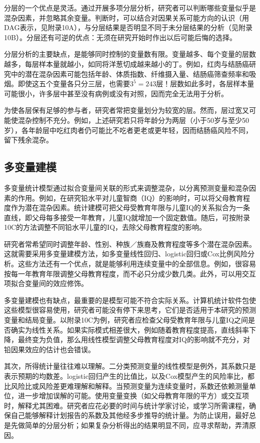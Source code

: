分层的一个优点是灵活。通过开展多项分层分析，研究者可以判断哪些变量似乎是混杂因素，并忽略其余变量。判断时，可以结合对因果关系可能方向的认识（用DAG表示，见附录10A），与分层结果是否明显不同于未分层结果的分析（见附录10B）。分层还有可逆的优点：无须在研究开始时作出以后可能后悔的选择。

分层分析的主要缺点，是能够同时控制的变量数有限。变量越多、每个变量的层数越多，每层样本量就越小，如同将洋葱切成越来越小的丁。例如，红肉与结肠癌研究中的潜在混杂因素可能包括年龄、体质指数、纤维摄入量、结肠癌筛查频率和吸烟。即使这五个变量各只分三层，也需要$3^5=243$层！层数如此多时，各层样本量可能很小，许多层中甚至没有病例或没有对照，因而完全无法用于分析。

为使各层保有足够的参与者，研究者常把变量划分为较宽的层。然而，层过宽又可能使混杂控制不充分。例如，上述研究若只将年龄分为两层（小于50岁与至少50岁），各年龄层中吃红肉者仍可能比不吃者更老或更年轻，因而结肠癌风险不同，留下残余混杂。

\subsection{多变量建模}
多变量统计模型通过拟合变量间关联的形式来调整混杂，以分离预测变量和混杂因素的作用。例如，在研究铅水平对儿童智商（IQ）的影响时，可以将父母教育程度作为潜在混杂因素。统计建模可把父母受教育年限与儿童IQ的关系拟合为一条直线，即父母每多接受一年教育，儿童IQ就增加一个固定数值。随后，可按附录10C的方法调整不同铅水平儿童的IQ，去除父母教育程度的影响。

研究者常希望同时调整年龄、性别、种族／族裔及教育程度等多个潜在混杂因素。这就需要采用多变量建模方法，如多变量线性回归、logistic回归或Cox比例风险分析。这些方法还有一个优点，就是能够利用连续变量中的全部信息。例如，很容易按每一年教育年限调整父母教育程度，而不必只分成少数几类。此外，可以用交互项拟合变量间的效应修饰。

多变量建模也有缺点，最重要的是模型可能不符合实际关系。计算机统计软件包使这些模型很容易使用，研究者可能没有停下来思考，它们是否适用于本研究的预测变量和结局变量。以附录10C为例，研究者应检查父母受教育年限与儿童IQ之间是否确实为线性关系。如果实际模式相差很大，例如随着教育程度提高，直线斜率下降，最终变为负值，那么用线性模型调整父母教育程度对IQ的影响就不充分，对铅因果效应的估计也会错误。

其次，所得统计量往往难以理解。二分类预测变量的线性模型是例外，其系数只是表示预期的均数差。logistic回归产生的比值比，以及Cox模型产生的风险率比，都比风险比或风险差更难理解和解释。当预测变量为连续变量时，系数还依赖测量单位，进一步增加误解的可能。使用变量变换（如父母教育年限的平方）或交互项时，解释尤其困难。研究者应花必要的时间与统计学家讨论，或学习所需课程，确保自己能够解释计划报告的系数及其他经多步推导的统计量。为防止误用，最好总是先做简单的分层分析；如果复杂分析得出的结果明显不同，应寻求帮助，弄清原因。

